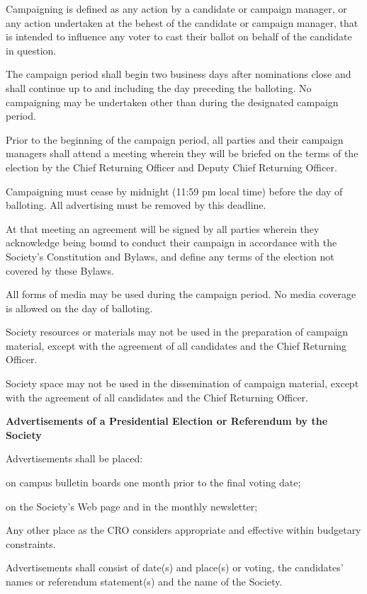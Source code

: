 \begin{longenum}[ label*=\thesection.\arabic*., align=left]
\begin{longenum}[label*=\arabic*., align=left]
 \item Campaigning is defined as any action by a candidate or campaign manager, or any action undertaken at the behest of the candidate or campaign manager, that is intended to influence any voter to cast their ballot on behalf of the candidate in question.
\item The campaign period shall begin two business days after nominations close and shall continue up to and including the day preceding the balloting. No campaigning may be undertaken other than during the designated campaign period.
\item Prior to the beginning of the campaign period, all parties and their campaign managers shall attend a meeting wherein they will be briefed on the terms of the election by the Chief Returning Officer and Deputy Chief Returning Officer.
\item Campaigning must cease by midnight (11:59 pm local time) before the day of balloting. All advertising must be removed by this deadline. 
\item At that meeting an agreement will be signed by all parties wherein they acknowledge being bound to conduct their campaign in accordance with the Society's Constitution and Bylaws, and define any terms of the election not covered by these Bylaws.
\item All  forms of media may be used during  the campaign period. No media coverage is allowed on  the day of balloting.
\item  Society resources or materials may not be used in the preparation of campaign material, except with the agreement of all candidates and the Chief Returning Officer.
\item Society space may not be used in the dissemination of campaign material, except with the agreement of all candidates and the Chief Returning Officer.
 \end{longenum}
 \item 	\textbf{Advertisements	of	a	Presidential	Election	or	Referendum	by	the	Society }
  \begin{longenum}[label*=\arabic*., align=left]
  \item Advertisements shall be placed:
 \begin{longenum}[label*=\arabic*., align=left]
\item on campus bulletin boards one month prior to the final voting date;
\item on the Society's Web page and in the monthly newsletter;
\item Any other place as the CRO considers appropriate and effective within budgetary 
constraints.
 \end{longenum}
\item Advertisements shall consist of date(s) and place(s) or voting, the candidates' names or referendum 
statement(s) and the name of the Society. 
 \end{longenum}
  

\end{longenum}
